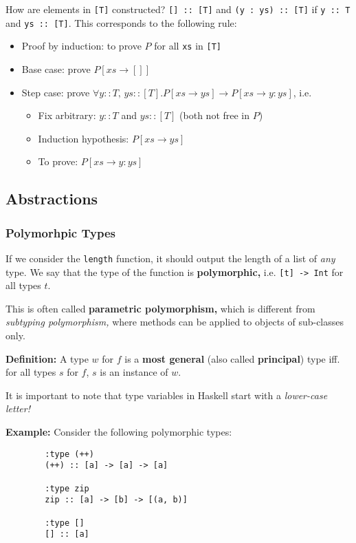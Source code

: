 \documentclass[a4paper]{extarticle}
\begin{document}
How are elements in \verb|[T]| constructed? \verb|[] :: [T]| and \verb|(y : ys) :: [T]| if \verb|y :: T| and \verb|ys :: [T]|. This corresponds to the following rule:

\begin{itemize}
    \item Proof by induction: to prove \(P\) for all \verb|xs| in \verb|[T]|
    \item Base case: prove \(P[xs \to []]\)
    \item Step case: prove \(\forall y :: T, \, ys :: [T].P[xs \to ys] \to P[xs \to y : ys]\), i.e.
    \begin{itemize}
        \item Fix arbitrary: \(y :: T\) and \(ys :: [T]\) (both not free in \(P\))
        \item Induction hypothesis: \(P[xs \to ys]\)
        \item To prove: \(P[xs \to y : ys]\)
    \end{itemize}
\end{itemize}

\subsection{Abstractions}

\subsubsection{Polymorhpic Types}

If we consider the \verb|length| function, it should output the length of a list of \textit{any} type. We say that the type of the function is \textbf{polymorphic,} i.e. \verb|[t] -> Int| for all types \(t\).

This is often called \textbf{parametric polymorphism,} which is different from \textit{subtyping polymorphism,} where methods can be applied to objects of sub-classes only.

\textbf{Definition:} A type \(w\) for \(f\) is a \textbf{most general} (also called \textbf{principal}) type iff. for all types \(s\) for \(f\), \(s\) is an instance of \(w\).

It is important to note that type variables in Haskell start with a \textit{lower-case letter!}

\begin{ebox}
    \textbf{Example:} Consider the following polymorphic types:
    \begin{verbatim}
        :type (++)
        (++) :: [a] -> [a] -> [a]

        :type zip
        zip :: [a] -> [b] -> [(a, b)]

        :type []
        [] :: [a]
    \end{verbatim}
\end{ebox}
\end{document}
